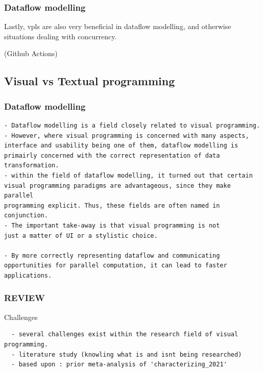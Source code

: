 \subsubsection{Dataflow modelling}
Lastly, vpls are also very beneficial in dataflow modelling, and otherwise situations dealing with concurrency. 

(Github Actions)





\subsection{Visual vs Textual programming}





\subsubsection*{Dataflow modelling}

\begin{lstlisting}
- Dataflow modelling is a field closely related to visual programming.
- However, where visual programming is concerned with many aspects, 
interface and usability being one of them, dataflow modelling is 
primairly concerned with the correct representation of data transformation.   
- within the field of dataflow modelling, it turned out that certain 
visual programming paradigms are advantageous, since they make parallel 
programming explicit. Thus, these fields are often named in conjunction. 
- The important take-away is that visual programming is not 
just a matter of UI or a stylistic choice.

- By more correctly representing dataflow and communicating 
opportunities for parallel computation, it can lead to faster applications.
\end{lstlisting}

\subsubsection*{REVIEW}
Challenges
\begin{lstlisting}
  - several challenges exist within the research field of visual programming. 
  - literature study (knowling what is and isnt being researched)
  - based upon : prior meta-analysis of 'characterizing_2021'
\end{lstlisting}

